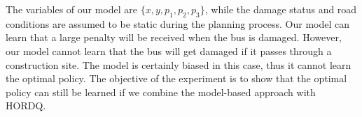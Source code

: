 
The variables of our model are $\{x, y, p_1, p_2, p_3\}$, while the damage
status and road conditions are assumed to be static during the planning process.
Our model can learn that a large penalty will be received when the bus is damaged.  
However, our model cannot learn that the bus will get damaged if it passes through
a construction site. The model is certainly biased in this case, thus
it cannot learn the optimal policy. The objective of 
the experiment is to show that the optimal policy can still be learned
if we combine the model-based approach with HORDQ. 



